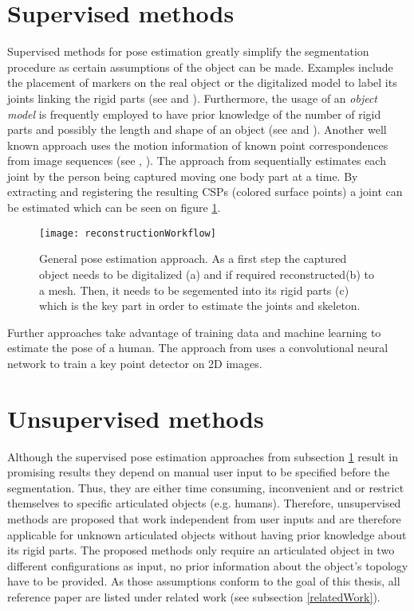 \section{Supervised methods}
\label{supervised}

Supervised methods for pose estimation greatly simplify the segmentation procedure as certain assumptions of the object can be made. Examples include the placement of markers on the real object or the digitalized model to label its joints linking the rigid parts (see \cite{hierarchicalMethod} and \cite{estimatingConfigurations}). Furthermore, the usage of an \textit{object model} is frequently employed to have prior knowledge of the number of rigid parts and possibly the length and shape of an object (see \cite{hierarchicalMethod} and \cite{mocapShapeFitting}). Another well known approach uses the motion information of known point correspondences from image sequences (see \cite{segmentationMotion}, \cite{animatedObjects}). The approach from \cite{sfsMocap} sequentially estimates each joint by the person being captured moving one body part at a time. By extracting and registering the resulting CSPs (colored surface points) a joint can be estimated which can be seen on figure \ref{fig:supervisedMotion}. 


\begin{figure}[H]
	\centering
	\texttt{[image: reconstructionWorkflow]}
	\caption{General pose estimation approach. As a first step the captured object needs to be digitalized (a) and if required reconstructed(b) to a mesh. Then, it needs to be segemented into its rigid parts (c) which is the key part in order to estimate the joints and skeleton.}
	\label{fig:supervisedMotion}
\end{figure}
Further approaches take advantage of training data and machine learning to estimate the pose of a human. The approach from \cite{consensusvoting} uses a convolutional neural network to train a key point detector on 2D images. 

\section{Unsupervised methods}
\label{unsupervised}

Although the supervised pose estimation approaches from subsection \ref{supervised} result in promising results they depend on manual user input to be specified before the segmentation. Thus, they are either time consuming, inconvenient and or restrict themselves to specific articulated objects (e.g. humans). Therefore, unsupervised methods are proposed that work independent from user inputs and are therefore applicable for unknown articulated objects without having prior knowledge about its rigid parts. The proposed methods only require an articulated object in two different configurations as input, no prior information about the object's topology have to be provided. As those assumptions conform to the goal of this thesis, all reference paper are listed under related work (see subsection \ref{relatedWork}). 

